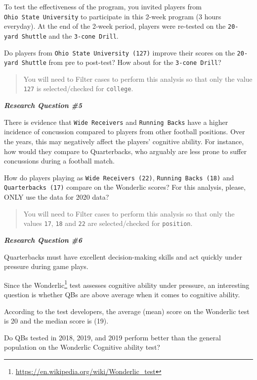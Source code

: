 \documentclass[11pt,]{article}
\begin{document}
To test the effectiveness of the program, you invited players from
\texttt{Ohio\ State\ University} to participate in this 2-week program
(3 hours everyday). At the end of the 2-week period, players were
re-tested on the \texttt{20-yard\ Shuttle} and the
\texttt{3-cone\ Drill}.

Do players from \texttt{Ohio\ State\ University\ (127)} improve their
scores on the \texttt{20-yard\ Shuttle} from pre to post-test? How about
for the \texttt{3-cone\ Drill}?

\begin{quote}
You will need to Filter cases to perform this analysis so that only the
value \texttt{127} is selected/checked for \texttt{college}.
\end{quote}

\textbf{\emph{Research Question \#5}}

There is evidence that \texttt{Wide\ Receivers} and
\texttt{Running\ Backs} have a higher incidence of concussion compared
to players from other football positions. Over the years, this may
negatively affect the players' cognitive ability. For instance, how
would they compare to Quarterbacks, who arguably are less prone to
suffer concussions during a football match.

How do players playing as \texttt{Wide\ Receivers\ (22)},
\texttt{Running\ Backs\ (18)} and \texttt{Quarterbacks\ (17)} compare on
the Wonderlic scores? For this analysis, please, ONLY use the data for
2020 data?

\begin{quote}
You will need to Filter cases to perform this analysis so that only the
values \texttt{17}, \texttt{18} and \texttt{22} are selected/checked for
\texttt{position}.
\end{quote}

\textbf{\emph{Research Question \#6}}

Quarterbacks must have excellent decision-making skills and act quickly
under pressure during game plays.

Since the Wonderlic\footnote{\url{https://en.wikipedia.org/wiki/Wonderlic_test}}
test assesses cognitive ability under pressure, an interesting question
is whether QBs are above average when it comes to cognitive ability.

According to the test developers, the average (mean) score on the
Wonderlic test is 20 and the median score is (19).

Do QBs tested in 2018, 2019, and 2019 perform better than the general
population on the Wonderlic Cognitive ability test?
\end{document}
